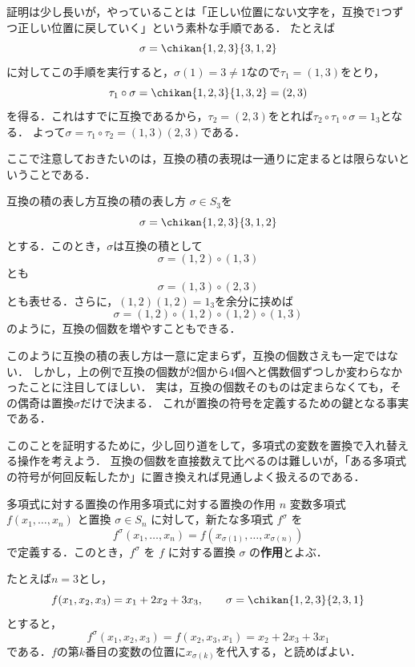 証明は少し長いが，やっていることは「正しい位置にない文字を，互換で$1$つずつ正しい位置に戻していく」という素朴な手順である．
たとえば
\[
  \sigma = \chikan{1,2,3}{3,1,2}
\]
に対してこの手順を実行すると，$\sigma(1) = 3 \ne 1$なので$\tau_1 = (1, 3)$をとり，
\[
  \tau_1 \circ \sigma = \chikan{1,2,3}{1,3,2} = (2, 3)
\]
を得る．これはすでに互換であるから，$\tau_2 = (2, 3)$をとれば$\tau_2 \circ \tau_1 \circ \sigma = 1_3$となる．
よって$\sigma = \tau_1 \circ \tau_2 = (1, 3)(2, 3)$である．

ここで注意しておきたいのは，互換の積の表現は一通りに定まるとは限らないということである．

\begin{example}{互換の積の表し方}{互換の積の表し方}
  $\sigma \in S_3$を
  \[
  \sigma = \chikan{1, 2, 3}{3, 1, 2}
  \]
  とする．このとき，$\sigma$は互換の積として
  \[
  \sigma = (1, 2) \circ (1, 3)
  \]
  とも
  \[
  \sigma = (1, 3) \circ (2, 3)
  \]
  とも表せる．さらに，$(1,2)(1,2) = 1_3$を余分に挟めば
  \[
    \sigma = (1, 2) \circ (1, 2) \circ (1, 2) \circ (1, 3)
  \]
  のように，互換の個数を増やすこともできる．
\end{example}

このように互換の積の表し方は一意に定まらず，互換の個数さえも一定ではない．
しかし，上の例で互換の個数が$2$個から$4$個へと偶数個ずつしか変わらなかったことに注目してほしい．
実は，互換の個数そのものは定まらなくても，その偶奇は置換$\sigma$だけで決まる．
これが置換の符号を定義するための鍵となる事実である．

このことを証明するために，少し回り道をして，多項式の変数を置換で入れ替える操作を考えよう．
互換の個数を直接数えて比べるのは難しいが，「ある多項式の符号が何回反転したか」に置き換えれば見通しよく扱えるのである．

\begin{definition}{多項式に対する置換の作用}{多項式に対する置換の作用}
  $n$ 変数多項式 $f(x_1, \dots, x_n)$ と置換 $\sigma \in S_n$ に対して，新たな多項式 $f^\sigma$ を
  \[
  f^\sigma(x_1, \dots, x_n) = f(x_{\sigma(1)}, \dots, x_{\sigma(n)})
  \]
  で定義する．このとき，$f^\sigma$ を $f$ に対する置換 $\sigma$ の\textbf{作用}とよぶ．
\end{definition}

たとえば$n = 3$とし，
\[
  f(x_1, x_2, x_3) = x_1 + 2x_2 + 3x_3, \qquad
  \sigma = \chikan{1,2,3}{2,3,1}
\]
とすると，
\[
  f^\sigma(x_1, x_2, x_3) = f(x_2, x_3, x_1) = x_2 + 2x_3 + 3x_1
\]
である．$f$の第$k$番目の変数の位置に$x_{\sigma(k)}$を代入する，と読めばよい．

